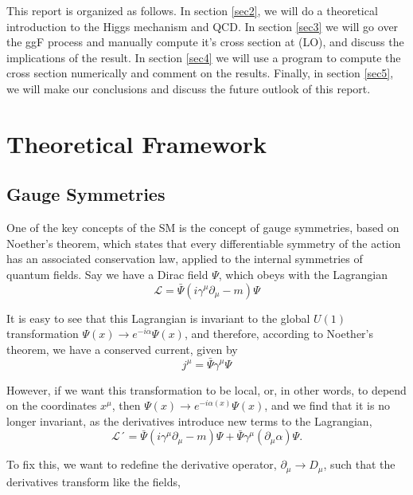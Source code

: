 \documentclass[EPJ,twocolumn]{webofc}
\begin{document}
This report is organized as follows. In section \ref{sec2}, we will do a theoretical introduction to the Higgs mechanism and QCD. In section \ref{sec3} we will go over the ggF process and manually compute it's cross section at (LO), and discuss the implications of the result. In section \ref{sec4} we will use a program to compute the cross section numerically and comment on the results. Finally, in section \ref{sec5}, we will make our conclusions and discuss the future outlook of this report.


\section{\label{sec2}Theoretical Framework}

\subsection*{Gauge Symmetries}
One of the key concepts of the SM is the concept of gauge symmetries, based on Noether's theorem, which states that every differentiable symmetry of the action has an associated conservation law, applied to the internal symmetries of quantum fields.
Say we have a Dirac field $\Psi$, which obeys with the Lagrangian
\begin{equation}
    \mathcal{L} = \bar{\Psi}\left(i\gamma^{\mu}\partial_{\mu}-m\right)\Psi
\end{equation}

It is easy to see that this Lagrangian is invariant to the global $U(1)$ transformation $\Psi(x)\rightarrow e^{-i\alpha}\Psi(x)$, and therefore, according to Noether's theorem, we have a conserved current, given by
\begin{equation}
    j^{\mu} = \bar{\Psi}\gamma^{\mu}\Psi
\end{equation}

However, if we want this transformation to be local, or, in other words, to depend on the coordinates $x^{\mu}$, then $\Psi(x)\rightarrow e^{-i\alpha(x)}\Psi(x)$, and we find that it is no longer invariant, as the derivatives introduce new terms to the Lagrangian,
\begin{equation}
    \mathcal{L}´ = \bar{\Psi}\left(i\gamma^{\mu}\partial_{\mu}-m\right)\Psi+\bar{\Psi}\gamma^{\mu}\left(\partial_{\mu}\alpha\right)\Psi.
\end{equation}

To fix this, we want to redefine the derivative operator, $\partial_{\mu} \rightarrow D_{\mu} $, such that the derivatives transform like the fields,
\end{document}
